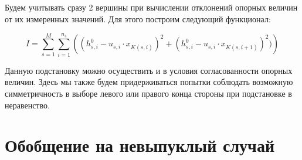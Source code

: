 \documentclass[a4paper, 12pt, titlepage]{article}
\theoremstyle{definition}
\theoremstyle{plain}
\theoremstyle{plain}
\begin{document}
Будем учитывать сразу 2 вершины при вычислении отклонений опорных величин от их
измеренных значений. Для этого построим следующий функционал:

\begin{equation}
 I = \sum \limits_{s = 1}^{M} \sum \limits_{i = 1}^{n_{s}}
 \left((h_{s, i}^{0} - u_{s, i} \cdot x_{K(s, i)})^{2} +
       (h_{s, i}^{0} - u_{s, i} \cdot x_{K(s, i + 1)})^{2})\right)
\end{equation}

Данную подстановку можно осуществить и в условия согласованности опорных
величин. Здесь мы также будем придерживаться попытки соблюдать возможную
симметричность в выборе левого или правого конца стороны при подстановке в
неравенство.



\section{Обобщение на невыпуклый случай}

\newpage


\end{document}
